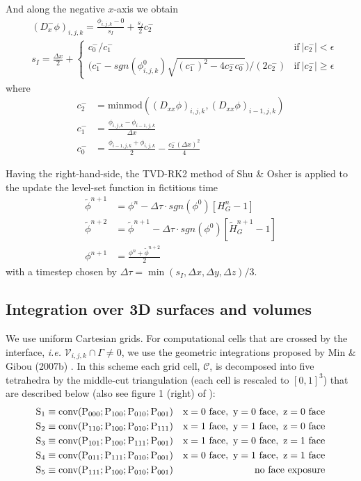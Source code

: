 \documentclass{elsarticle}
\begin{document}
And along the negative $x$-axis we obtain
\begin{align*}
 &(D_x^-\phi)_{i,j,k} = \frac{\phi_{i,j,k} - 0}{s_I} + \frac{s_I}{2} c_2^-\\
 & s_I = \frac{\Delta x}{2} + \left\{
 \begin{array}{ll}
 	c_0^-/c_1^-    & \textrm{if} \ \vert c_2^-\vert<\epsilon \\
 	\bigg(c_1^- - sgn(\phi^0_{i,j,k})\sqrt{(c_1^-)^2 - 4c_2^- c_0^-} \bigg)/(2 c_2^-)    & \textrm{if} \ \vert c_2^-\vert\ge \epsilon 
 \end{array}
\right.
\end{align*}
where 
\begin{align*}
	c_2^- &= \textrm{minmod}((D_{xx}\phi)_{i,j,k}, (D_{xx}\phi)_{i-1,j,k}) \\
	c_1^- &= \frac{\phi_{i,j,k} - \phi_{i-1,j,k}}{\Delta x} \\
	c_0^- &= \frac{\phi_{i-1,j,k} + \phi_{i,j,k}}{2} - \frac{c_2^- (\Delta x)^2}{4}
\end{align*}


Having the right-hand-side, the TVD-RK2 method of Shu \& Osher \cite{shu1988efficient} is applied to the update the level-set function in fictitious time
\begin{align*}
	\tilde{\phi}^{n+1}&=\phi^n - \Delta \tau \cdot sgn(\phi^0) [ H_G^n -1] \\
	\tilde{\phi}^{n+2}&=\tilde{\phi}^{n+1} - \Delta \tau \cdot sgn(\phi^0) [ \tilde{H}_G^{n+1} -1] \\
	\phi^{n+1}&=\frac{\phi^n + \tilde{\phi}^{n+2}}{2}
\end{align*}
with a timestep chosen by $\Delta \tau = \min (s_I, \Delta x, \Delta y, \Delta z) / 3$.

\subsection{Integration over 3D surfaces and volumes}
We use uniform Cartesian grids. For computational cells that are crossed by the interface, \textit{i.e.} $\mathcal{V}_{i,j,k}\cap \Gamma \neq 0$, we use the geometric integrations proposed by Min \& Gibou (2007b) \cite{min2007geometric}. In this scheme each grid cell, $\mathcal{C}$, is decomposed into five tetrahedra by the middle-cut triangulation \cite{sallee1984middle} (each cell is rescaled to $[0,1]^3$) that are described below (also see figure 1 (right) of \cite{min2007geometric}):
\begin{align*}
	 & \rm S_1 \equiv conv(P_{000} ; P_{100} ; P_{010} ; P_{001}) & \rm{ x = 0\ face,\ y = 0\ face,\ z = 0\ face} \\
	 & \rm S_2 \equiv conv(P_{110} ; P_{100} ; P_{010} ; P_{111}) & \rm{ x = 1\ face,\ y = 1\ face,\ z = 0\ face} \\
	 & \rm S_3 \equiv conv(P_{101} ; P_{100} ; P_{111} ; P_{001}) & \rm{ x = 1\ face,\ y = 0\ face,\ z = 1\ face} \\
	 & \rm S_4 \equiv conv(P_{011} ; P_{111} ; P_{010} ; P_{001}) & \rm{ x = 0\ face,\ y = 1\ face,\ z = 1\ face} \\
	 & \rm S_5\equiv conv(P_{111} ; P_{100} ; P_{010} ; P_{001})  & \rm{ no\ face\ exposure}
\end{align*}
\end{document}
